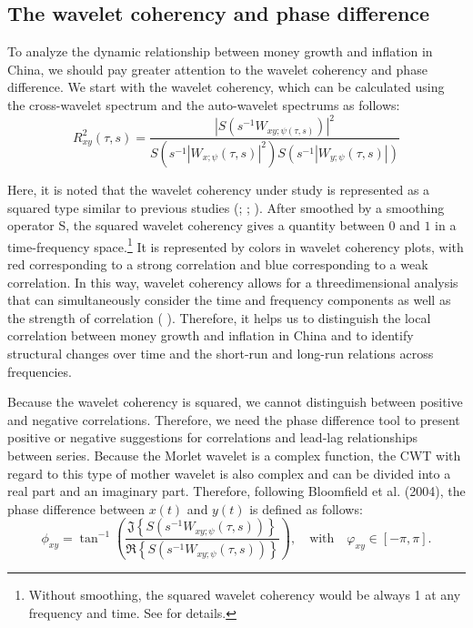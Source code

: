 \documentclass[a4paper,fleqn]{cas-sc}
\begin{document}
\subsection{The wavelet coherency and phase difference} \label{sec:3.3}
To analyze the dynamic relationship between money growth and inflation in China, we should pay greater attention to the wavelet coherency and phase difference. We start with the wavelet coherency, which can be calculated using the cross-wavelet spectrum and the auto-wavelet spectrums as follows:
\begin{equation}
    R^{2}_{xy}(\tau,s)=\frac{\left|S\left(s^{-1}W_{xy;\psi(\tau,s)}\right)\right|^2}{S\left(s^{-1}\left|W_{x;\psi}(\tau,s)\right|^2\right)S\left(s^{-1}\left|W_{y;\psi}(\tau,s)\right|\right)}
\end{equation}

Here, it is noted that the wavelet coherency under study is represented as a squared type similar to previous studies (\citealp{AGUIARCONRARIA2008}; \citealp{grinsted2004}; \citealp{Rua2012}). After smoothed by a smoothing operator S, the squared wavelet coherency gives a quantity between $0$ and $1$ in a time-frequency space.\footnote{Without smoothing, the squared wavelet coherency would be always 1 at any frequency and time. See \cite{torrence1998} for details.} It is represented by colors in wavelet coherency plots, with red corresponding to a strong correlation and blue corresponding to a weak correlation. In this way, wavelet coherency allows for a threedimensional analysis that can simultaneously consider the time and frequency components as well as the strength of correlation ( \citealp{loh2013}). Therefore, it helps us to distinguish the local correlation between money growth and inflation in China and to identify structural changes over time and the short-run and long-run relations across frequencies.

Because the wavelet coherency is squared, we cannot distinguish between positive and negative correlations. Therefore, we need the phase difference tool to present positive or negative suggestions for correlations and lead-lag relationships between series. Because the Morlet wavelet is a complex function, the CWT with regard to this type of mother wavelet is also complex and can be divided into a real part and an imaginary part. Therefore, following Bloomfield et al. (2004), the phase difference between $x(t)$ and $y(t)$ is defined as follows:
\begin{equation}
    \phi_{xy}=\tan^{-1} \left(\frac{\mathfrak{J}\left\{S\left(s^{-1}W_{xy;\psi}(\tau,s)\right)\right\}}{\mathfrak{R} \left\{S\left(s^{-1}W_{xy;\psi}(\tau,s)\right)\right\}}\right),\quad \mbox{with}\quad \varphi_{xy}\in[-\pi,\pi].
\end{equation}
\end{document}
